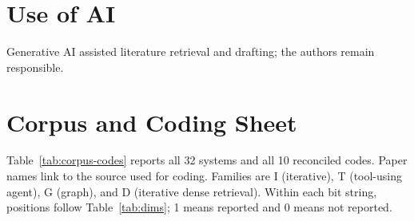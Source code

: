 \documentclass[11pt]{article}
\begin{document}
\section*{Use of AI}
Generative AI assisted literature retrieval and drafting; the authors remain responsible.



\appendix
\section{Corpus and Coding Sheet}
\label{app:corpus}
Table~\ref{tab:corpus-codes} reports all 32 systems and all 10 reconciled codes. Paper names link to
the source used for coding. Families are I (iterative), T (tool-using agent), G (graph), and D
(iterative dense retrieval). Within each bit string, positions follow Table~\ref{tab:dims}; 1 means
reported and 0 means not reported.
\end{document}
